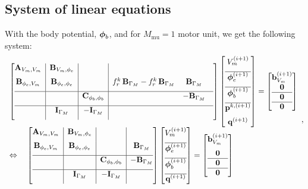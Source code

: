 \subsection{System of linear equations} 
With the body potential, $\boldsymbol{\phi}_b$, and for $M_\text{mu}=1$ motor unit, we get the following system:
\begin{equation*}
  \begin{array}{lll}
    \left[\begin{array}{@{}c|c|c|ccc@{}}
      \bfA_{V_m,V_m} & \bfB_{V_m,\phi_e} & &&\\[2mm]
      \bfB_{\phi_e,V_m} & \bfB_{\phi_e,\phi_e} & &f_r^k \,\bfB_{\Gamma_M}-f_r^k \,\bfB_{\Gamma_M}  & \bfB_{\Gamma_M}& \\[2mm] \hline
      &&\bfC_{\phi_b,\phi_b} & & -\bfB_{\Gamma_M}&\\[2mm]\hline
      & \bfI_{\Gamma_M} & -\bfI_{\Gamma_M} && &\\[2mm]
    \end{array}\right]
    \left[\begin{array}{@{}c@{}}
      V_{m}^{(i+1)}  \\[2mm]\hline 
      \bfphi_{e}^{(i+1)} \\[2mm]\hline
      \bfphi_{b}^{(i+1)} \\[2mm]\hline
      \bfp^{k,(i+1)} \\[2mm] 
      \bfq^{(i+1)}
    \end{array}\right]
    = 
    \left[\begin{array}{@{}c@{}}
      \bfb_{V_m}^{(i+1)} \\
      \bfzero \\\hline
      \bfzero\\\hline 
      \bfzero
    \end{array}\right]\\[4mm]
    \Leftrightarrow
    \quad 
    \left[\begin{array}{@{}c|c|c|c@{}}
      \bfA_{V_m,V_m} & \bfB_{V_m,\phi_e} & &\\[2mm]
      \bfB_{\phi_e,V_m} & \bfB_{\phi_e,\phi_e} & &\bfB_{\Gamma_M} \\[2mm] \hline
      &&\bfC_{\phi_b,\phi_b} & -\bfB_{\Gamma_M}\\[2mm]\hline
      & \bfI_{\Gamma_M} & -\bfI_{\Gamma_M} &\\[2mm]
    \end{array}\right]
    \left[\begin{array}{@{}c@{}}
      V_{m}^{(i+1)}  \\[2mm]\hline 
      \bfphi_{e}^{(i+1)} \\[2mm]\hline
      \bfphi_{b}^{(i+1)}  \\[2mm]\hline
      \bfq^{(i+1)}
    \end{array}\right]
    = 
    \left[\begin{array}{@{}c@{}}
      \bfb_{V_m}^{(i+1)} \\[2mm]
      \bfzero\\\hline
      \bfzero\\\hline 
      \bfzero
    \end{array}\right]
  \end{array},
\end{equation*}
